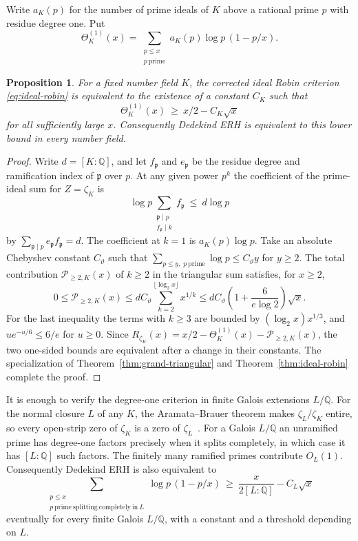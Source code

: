 \documentclass[11pt]{amsart}
\newtheorem{proposition}[theorem]{Proposition}
\theoremstyle{definition}
\theoremstyle{remark}
\numberwithin{equation}{section}
\begin{document}
Write \(a_K(p)\) for the number of prime ideals of \(K\) above a
rational prime \(p\) with residue degree one. Put
\[
 \Theta_K^{(1)}(x)=\sum_{\substack{p\le x\\p\ \mathrm{prime}}}
     a_K(p)\log p\,(1-p/x).
\]
\begin{proposition}\label{prop:degree-one-primes}
For a fixed number field \(K\), the corrected ideal Robin criterion
\eqref{eq:ideal-robin} is equivalent to the existence of a constant
\(C_K\) such that
\[
 \Theta_K^{(1)}(x)\ \geq\ x/2-C_K\sqrt{x}
\]
for all sufficiently large \(x\). Consequently Dedekind ERH is
equivalent to this lower bound in every number field.
\end{proposition}

\begin{proof}
Write \(d=[K:\mathbb Q]\), and let \(f_{\mathfrak p}\) and
\(e_{\mathfrak p}\) be the residue degree and ramification index
of \(\mathfrak p\) over \(p\). At any given power \(p^k\) the
coefficient of the prime-ideal sum for \(Z=\zeta_K\) is
\[
 \log p\sum_{\substack{\mathfrak p\mid p\\ f_{\mathfrak p}\mid k}}
       f_{\mathfrak p} \ \leq\ d\log p
\]
by \(\sum_{\mathfrak p\mid p}e_{\mathfrak p}f_{\mathfrak p}=d\).
The coefficient at \(k=1\) is \(a_K(p)\log p\).
Take an absolute Chebyshev constant \(C_\vartheta\) such that
\(\sum_{p\le y,\;p\ \mathrm{prime}}\log p\le C_\vartheta y\) for
\(y\ge2\). The total contribution \(\mathcal P_{\ge2,K}(x)\) of \(k\ge2\) in the
triangular sum satisfies, for \(x\ge2\),
\[
 0\leq \mathcal P_{\ge2,K}(x)
 \leq d C_\vartheta\sum_{k=2}^{\lfloor\log_2 x\rfloor} x^{1/k}
 \leq d C_\vartheta\left(1+\frac{6}{e\log 2}\right)\sqrt{x}.
\]
For the last inequality the terms with \(k\ge3\) are bounded by
\((\log_2 x)x^{1/3}\), and \(u e^{-u/6}\le6/e\) for \(u\ge0\).
Since \(R_{\zeta_K}(x)=x/2-\Theta_K^{(1)}(x)-\mathcal P_{\ge2,K}(x)\), the two
one-sided bounds are equivalent after a change in their constants.
The specialization of Theorem~\ref{thm:grand-triangular} and
Theorem~\ref{thm:ideal-robin} complete the proof.
\end{proof}

It is enough to verify the degree-one criterion in finite Galois
extensions \(L/\mathbb Q\). For the normal closure \(L\) of any
\(K\), the Aramata--Brauer theorem makes \(\zeta_L/\zeta_K\)
entire, so every open-strip zero of \(\zeta_K\) is a zero of
\(\zeta_L\)~\cite{GunHazraSahuArtin}. For a Galois \(L/\mathbb Q\)
an unramified prime has degree-one factors precisely when it
splits completely, in which case it has \([L:\mathbb Q]\) such
factors. The finitely many ramified primes contribute \(O_L(1)\).
Consequently Dedekind ERH is also equivalent to
\[
 \sum_{\substack{p\le x\\p\ \mathrm{prime\ splitting\ completely\ in}\ L}}
       \log p\,(1-p/x)
 \ \geq\ \frac{x}{2[L:\mathbb Q]}-C_L\sqrt{x}
\]
eventually for every finite Galois \(L/\mathbb Q\), with a constant
and a threshold depending on \(L\).
\end{document}
